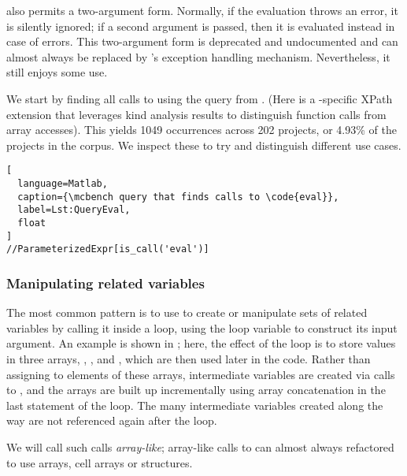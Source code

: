  also permits a two-argument form. Normally, if the evaluation
throws an error, it is silently ignored; if a second argument is passed, then
it is evaluated instead in case of errors. This two-argument form is deprecated
and undocumented and can almost always be replaced by \matlab's  exception handling mechanism. Nevertheless, it still enjoys some use.

We start by finding all calls to  using the query from
. (Here  is a \mcbench-specific XPath
extension that leverages kind analysis results to distinguish function calls
from array accesses). This yields 1049 occurrences across 202 projects, or
4.93\% of the projects in the corpus. We inspect these to try and distinguish
different use cases.

\begin{lstlisting}[
  language=Matlab,
  caption={\mcbench query that finds calls to \code{eval}},
  label=Lst:QueryEval,
  float
]
//ParameterizedExpr[is_call('eval')]
\end{lstlisting}


\subsubsection{Manipulating related variables}

The most common pattern is to use  to create or manipulate sets of
related variables by calling it inside a loop, using the loop variable to
construct its input argument. An example is shown in ;
here, the effect of the loop is to store values in three arrays, ,
, and , which are then used later in the code. Rather than
assigning to elements of these arrays, intermediate variables are created via
calls to , and the arrays are built up incrementally using array
concatenation in the last statement of the loop. The many intermediate
variables created along the way are not referenced again after the loop.

We will call such calls \emph{array-like}; array-like calls to  can
almost always refactored to use arrays, cell arrays or structures.



